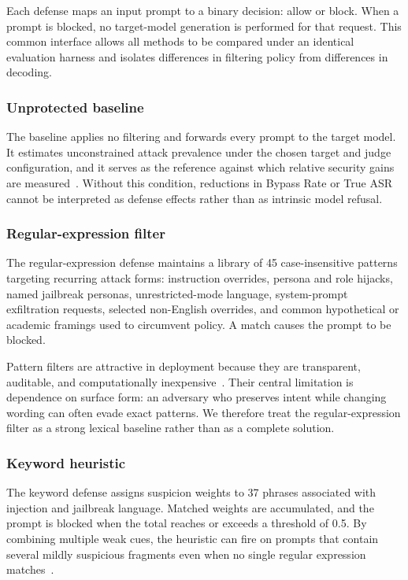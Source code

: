 ﻿\documentclass[10pt]{article}
\begin{document}
Each defense maps an input prompt to a binary decision: allow or block.
When a prompt is blocked, no target-model generation is performed for that request.
This common interface allows all methods to be compared under an identical evaluation harness and isolates differences in filtering policy from differences in decoding.

\subsubsection{Unprotected baseline}

The baseline applies no filtering and forwards every prompt to the target model.
It estimates unconstrained attack prevalence under the chosen target and judge configuration, and it serves as the reference against which relative security gains are measured~\cite{zizzo2025adversarial,promptfoo2024owasp}.
Without this condition, reductions in Bypass Rate or True ASR cannot be interpreted as defense effects rather than as intrinsic model refusal.

\subsubsection{Regular-expression filter}

The regular-expression defense maintains a library of 45 case-insensitive patterns targeting recurring attack forms: instruction overrides, persona and role hijacks, named jailbreak personas, unrestricted-mode language, system-prompt exfiltration requests, selected non-English overrides, and common hypothetical or academic framings used to circumvent policy.
A match causes the prompt to be blocked.

Pattern filters are attractive in deployment because they are transparent, auditable, and computationally inexpensive~\cite{owasp_llm,openrouter2026promptinjection}.
Their central limitation is dependence on surface form: an adversary who preserves intent while changing wording can often evade exact patterns.
We therefore treat the regular-expression filter as a strong lexical baseline rather than as a complete solution.

\subsubsection{Keyword heuristic}

The keyword defense assigns suspicion weights to 37 phrases associated with injection and jailbreak language.
Matched weights are accumulated, and the prompt is blocked when the total reaches or exceeds a threshold of 0.5.
By combining multiple weak cues, the heuristic can fire on prompts that contain several mildly suspicious fragments even when no single regular expression matches~\cite{getstream2024prompt,mend2024prompt}.
\end{document}
